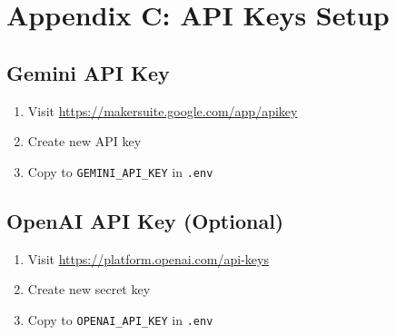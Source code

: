 \documentclass[12pt,a4paper]{article}
\begin{document}
\section{Appendix C: API Keys Setup}

\subsection{Gemini API Key}
\begin{enumerate}
    \item Visit \url{https://makersuite.google.com/app/apikey}
    \item Create new API key
    \item Copy to \texttt{GEMINI\_API\_KEY} in \texttt{.env}
\end{enumerate}

\subsection{OpenAI API Key (Optional)}
\begin{enumerate}
    \item Visit \url{https://platform.openai.com/api-keys}
    \item Create new secret key
    \item Copy to \texttt{OPENAI\_API\_KEY} in \texttt{.env}
\end{enumerate}
\end{document}
